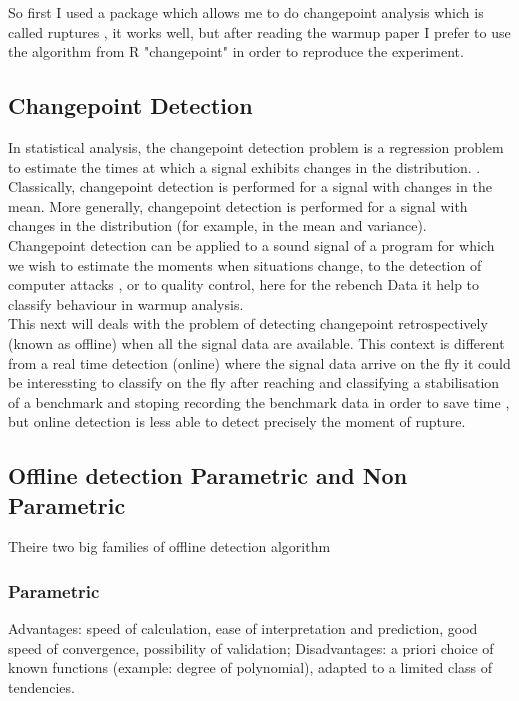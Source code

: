 \documentclass{article}
\begin{document}
So first I used a package which allows me to do changepoint analysis which is called ruptures \cite{truong2020selective}, it works well, but after reading the warmup paper I prefer to use the algorithm from R "changepoint" \cite{killick2014changepoint} in order to reproduce the experiment.



\subsection{Changepoint Detection}
In statistical analysis, the changepoint detection problem is a regression problem to estimate the times at which a signal exhibits changes in the distribution. . Classically, changepoint detection is performed for a signal with changes in the mean. More generally, changepoint detection is performed for a signal with changes in the distribution (for example, in the mean and variance). \\

Changepoint  detection can be applied to a sound signal of a program for which we wish to estimate the moments when situations change, to the detection of computer attacks  , or to quality control, here for the rebench Data it help to classify behaviour in warmup analysis. \\

This next will deals with the problem of detecting changepoint retrospectively (known as offline) when all the signal data are available. This context is different from a real time detection (online) where the signal data arrive on the fly it could be interessting to classify on the fly after reaching  and classifying a stabilisation of a benchmark and stoping recording the benchmark data in order to save time , but online detection is less able to detect precisely the moment of rupture.

\subsection{Offline detection Parametric and Non Parametric}
 
 
Theire two big families of offline detection algorithm

\subsubsection{Parametric}

Advantages: speed of calculation, ease of interpretation and prediction,
good speed of convergence, possibility of validation;
Disadvantages: a priori choice of known functions (example: degree of polynomial), adapted to a limited class of tendencies.
\end{document}

